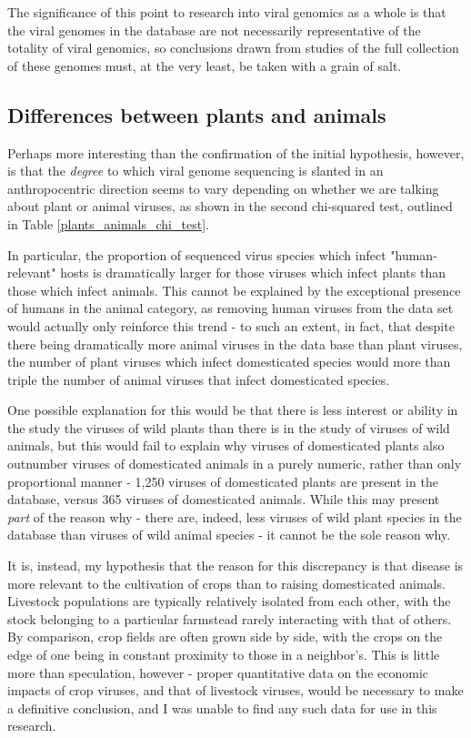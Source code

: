 \documentclass[12pt]{article}
\begin{document}
    The significance of this point to research into viral genomics as a whole is
    that the viral genomes in the database are not necessarily representative of
    the totality of viral genomics, so conclusions drawn from studies of the full
    collection of these genomes must, at the very least, be taken with a grain of
    salt.

    \subsection{Differences between plants and animals}

    Perhaps more interesting than the confirmation of the initial hypothesis,
    however, is that the \emph{degree} to which viral genome sequencing is slanted in
    an anthropocentric direction seems to vary depending on whether we are
    talking about plant or animal viruses, as shown in the second chi-squared
    test, outlined in Table \ref{plants_animals_chi_test}.

    In particular, the proportion of sequenced virus species which infect 
    "human-relevant" hosts is dramatically larger for those viruses which infect
    plants than those which infect animals. This cannot be explained by the
    exceptional presence of humans in the animal category, as removing
    human viruses from the data set would actually only reinforce this trend
    - to such an extent, in fact, that despite there being dramatically more
    animal viruses in the data base than plant viruses, the number of plant
    viruses which infect domesticated species would more than triple the number
    of animal viruses that infect domesticated species.

    One possible explanation for this would be that there is less interest or
    ability in the study the viruses of wild plants than there is in the study
    of viruses of wild animals, but this would fail to explain why viruses
    of domesticated plants also outnumber viruses of domesticated animals in a
    purely numeric, rather than only proportional manner - 1,250 viruses of
    domesticated plants are present in the database, versus 365 viruses of
    domesticated animals. While this may present \emph{part} of the reason
    why - there are, indeed, less viruses of wild plant species in the database
    than viruses of wild animal species - it cannot be the sole reason why.

    It is, instead, my hypothesis that the reason for this discrepancy is that
    disease is more relevant to the cultivation of crops than to raising
    domesticated animals. Livestock populations are typically relatively
    isolated from each other, with the stock belonging to a particular
    farmstead rarely interacting with that of others. By comparison, crop fields
    are often grown side by side, with the crops on the edge of one being in
    constant proximity to those in a neighbor's. This is little more than
    speculation, however - proper quantitative data on the economic impacts of
    crop viruses, and that of livestock viruses, would be necessary to make
    a definitive conclusion, and I was unable to find any such data for use
    in this research.
\end{document}
